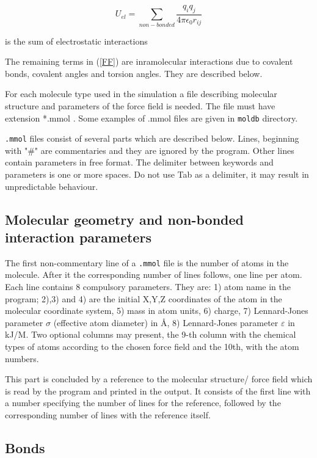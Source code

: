 \documentclass{article}
\begin{document}
\begin{equation}
U_{el} = \sum_{non-bonded}\frac{q_iq_j}{4\pi\epsilon_0r_{ij}}
\end{equation}

is the sum of electrostatic interactions

The remaining terms in (\ref{FF}) are inramolecular interactions
due to covalent bonds, covalent angles and torsion angles. They are 
described below.

For each molecule type used in the simulation a file describing molecular 
structure and parameters of the force field is needed. The 
file must have extension *.mmol . Some examples of .mmol files are given 
in \verb|moldb| directory.
 
\verb|.mmol| files consist of several parts which are described below.
Lines, beginning with "\#" are commentaries and they are ignored by the 
program. Other lines contain parameters in free format. The delimiter 
between keywords and parameters is one or more spaces. Do not use Tab as 
a delimiter, it may result in unpredictable behaviour. 

\subsection{Molecular geometry and non-bonded interaction parameters}

The first non-commentary line of a \verb|.mmol| file is the number of atoms 
in the molecule. After it the corresponding number of lines follows, one 
line per atom. Each line contains 8 compulsory
parameters. They are: 1) atom name in the program; 2),3) and 4) are the
initial X,Y,Z coordinates of the atom in the molecular coordinate system,
5) mass in atom units, 6) charge, 7) Lennard-Jones parameter $\sigma$
(effective atom diameter) in \AA, 8) Lennard-Jones parameter $\varepsilon$
in kJ/M. Two optional columns may present, the 9-th column with the
chemical types of atoms according to the chosen force field and the 10th,
with the atom numbers.

This part is concluded by a reference to the molecular structure/
force field which is read by the program and printed in the output. It
consists of the first line with a number specifying the number of lines 
for the reference, followed by the corresponding number of lines with the 
reference itself.

\subsection{Bonds}
\end{document}
